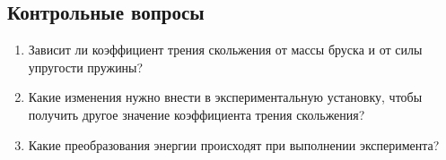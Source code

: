 \documentclass[a4paper, 12pt]{extarticle}
\begin{document}
\subsection{Контрольные вопросы}
\begin{enumerate}
\item Зависит ли коэффициент трения скольжения от массы бруска и от силы упругости пружины?
\item Какие изменения нужно внести в экспериментальную установку, чтобы получить другое значение коэффициента трения скольжения? 
\item Какие преобразования энергии происходят при выполнении эксперимента?
\end{enumerate}
\end{document}
